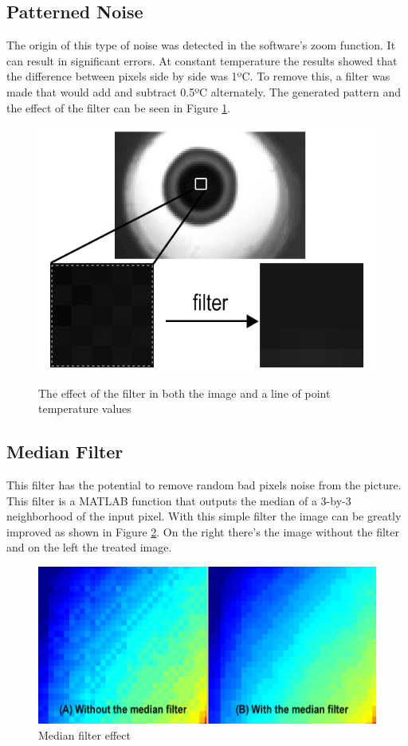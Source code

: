 \subsection{Patterned Noise}

\par The origin of this type of noise was detected in the software's zoom function. It can result in significant errors. At constant temperature the results showed that the  difference between pixels side by side was 1ºC. To remove this, a filter was made that would add and subtract 0.5ºC alternately. The generated pattern and the effect of the filter can be seen in Figure \ref{fig:chess}.

\begin{figure}[h]
\centering
\includegraphics[width=0.5\linewidth]{Figures/4.Chapter/chess2.png}\\
%

\caption{The effect of the filter in both the image and a line of point temperature values}
\label{fig:chess}
\end{figure}


\subsection{Median Filter}

\par This filter has the potential to remove random bad pixels noise from the picture. This filter is a MATLAB function that outputs the median of a 3-by-3 neighborhood of the input pixel. With this simple filter the image can be greatly improved as shown in Figure \ref{fig:median}. On the right there's the image without the filter and on the left the treated image.

\begin{figure}[h]
\centering
\includegraphics[width=0.6\linewidth]{Figures/4.Chapter/median.png}
\caption{Median filter effect}
\label{fig:median}
\end{figure}

